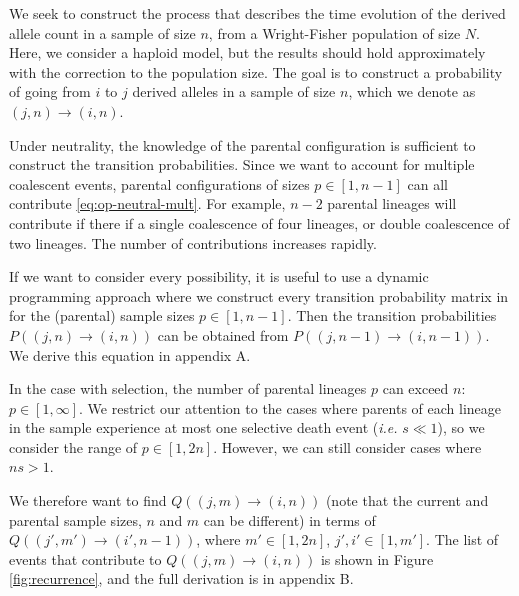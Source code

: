 \documentclass[review]{elsarticle}
\newcommand{\ra}{\rightarrow}
\begin{document}
We seek to construct the process that describes the time evolution of the derived allele count in a
sample of size $n$, from a Wright-Fisher population of size $N$. Here, we consider a haploid model,
but the results should hold approximately with the correction to the population size. The goal is to
construct a probability of going from $i$ to $j$ derived alleles in a sample of size $n$, which we
denote as $(j,n)\ra(i,n)$.

Under neutrality, the knowledge of the parental configuration is sufficient to construct the
transition probabilities. Since we want to account for multiple coalescent events, parental
configurations of sizes $p \in [1, n-1]$ can all contribute \eqref{eq:op-neutral-mult}. For example,
$n-2$ parental lineages will contribute if there if a single coalescence of four lineages, or double
coalescence of two lineages. The number of contributions increases rapidly.

If we want to consider every possibility, it is useful to use a dynamic programming approach where
we construct every transition probability matrix in for the (parental) sample sizes $p \in [1,n-1]$.
Then the transition probabilities $P((j,n)\ra(i,n))$ can be obtained from $P((j,n-1)\ra(i,n-1))$.
We derive this equation in appendix A.

In the case with selection, the number of parental lineages $p$ can exceed $n$: $p\in[1, \infty]$.
We restrict our attention to the cases where parents of each lineage in the sample experience at
most one selective death event (\textit{i.e.} $s \ll 1$), so we consider the range of $p \in [1, 2n]$.
However, we can still consider cases where $ns > 1$.

We therefore want to find $Q((j,m)\ra(i,n))$ (note that the current and parental sample sizes, $n$
and $m$ can be different) in terms of $Q((j',m')\ra(i',n-1))$, where $m' \in [1, 2n]$, $j',i' \in
[1, m']$. The list of events that contribute to $Q((j,m)\ra(i,n))$ is shown in Figure
\ref{fig:recurrence}, and the full derivation is in appendix B.
\end{document}
